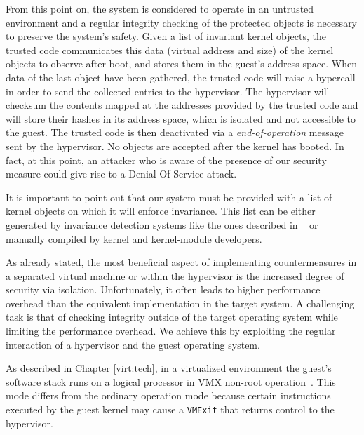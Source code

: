 From this point on, the system is considered to operate in an untrusted environment and a regular integrity checking of the protected objects is necessary to preserve the system's safety.
Given a list of invariant kernel objects, the trusted code communicates this data (virtual address and size) of the kernel objects to observe after boot, and stores them in the guest's address space. When data of the last object have been gathered, the trusted code will raise a hypercall in order to send the collected entries to the hypervisor. The hypervisor will checksum the contents mapped at the addresses provided by the trusted code and will store their hashes in its address space, which is isolated and not accessible to the guest. The trusted code is then deactivated via a \emph{end-of-operation} message sent by the hypervisor. No objects are accepted after the kernel has booted. In fact, at this point, an attacker who is aware of the presence of our security measure could give rise to a Denial-Of-Service attack.

It is important to point out that our system must be provided with a list of kernel objects on which it will enforce invariance. This list can be either generated by invariance detection systems like the ones described in ~\cite{HookSafe,6,7,8} or manually compiled by kernel and kernel-module developers.

As already stated, the most beneficial aspect of implementing countermeasures in a separated virtual machine or within the hypervisor is the increased degree of security via isolation. Unfortunately, it often leads to higher performance overhead than the equivalent implementation in the target system. 
A challenging task is that of checking integrity outside of the target operating system while limiting the performance overhead. We achieve this by exploiting the regular interaction of a hypervisor and the guest operating system. 

As described in Chapter \ref{virt:tech}, in a virtualized environment the guest's software stack runs on a logical processor in VMX non-root operation~\cite{Intel2007}. This mode differs from the ordinary operation mode because certain instructions executed by the guest kernel may cause a \texttt{VMExit} that returns control to the hypervisor.


